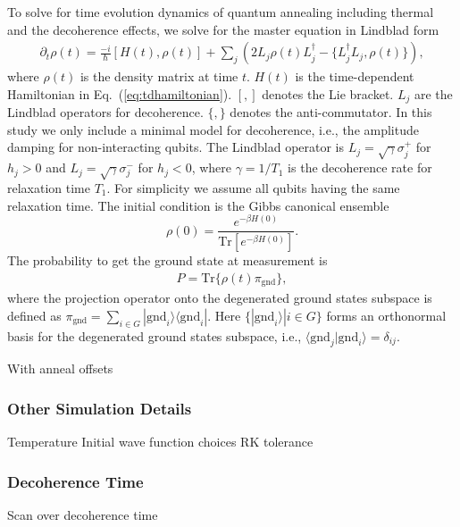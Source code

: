 \documentclass[prd,twocolumn,tightenlines,preprintnumbers,showpacs,superscriptaddress,notitlepage,nofootinbib,eqsecnum,floatfix,longbibliography]{revtex4}
\begin{document}
{\color{blue}


To solve for time evolution dynamics of quantum annealing including thermal and the decoherence effects, we solve for the master equation in Lindblad form
\begin{align}
\partial_t \rho (t) =  \frac{-i}{\hbar} [H(t) , \rho(t)] + \sum_j (2L_j \rho(t) L_j^\dagger - \{ L^\dagger_j L_j, \rho(t) \}) ,
\end{align}
where $\rho (t)$ is the density matrix at time $t$. $H(t)$ is the time-dependent Hamiltonian in Eq.~(\ref{eq:tdhamiltonian}). $[,]$ denotes the Lie bracket. $L_j$ are the Lindblad operators for decoherence. $\{, \}$ denotes the anti-commutator. In this study we only include a minimal model for decoherence, i.e., the amplitude damping for non-interacting qubits. The Lindblad operator is $L_j=\sqrt{\gamma} \sigma^{+}_j$ for $h_j>0$ and $L_j=\sqrt{\gamma} \sigma^{-}_j$ for $h_j<0$, where $\gamma = 1/T_1$ is the decoherence rate for relaxation time $T_1$. For simplicity we assume all qubits having the same relaxation time. The initial condition is the Gibbs canonical ensemble
\begin{equation}
\rho (0) =  \frac{e^{-\beta H(0)}}{\mbox{Tr}[e^{-\beta H(0)}]} .
\end{equation}
The probability to get the ground state at measurement is
\begin{align}
P =  \mbox{Tr} \{  \rho (t) \pi_{\mbox{gnd}} \}  ,
\end{align}
where the projection operator onto the degenerated ground states subspace is defined as $\pi_{\mbox{gnd}}=\sum_{i\in G} |\mbox{gnd}_i\rangle \langle \mbox{gnd}_i| $. Here $\{ | \mbox{gnd}_i \rangle | i \in G \}$ forms an orthonormal basis for the degenerated ground states subspace, i.e., $\langle \mbox{gnd}_j | \mbox{gnd}_i \rangle = \delta_{ij}$.





}

With anneal offsets

\subsubsection{Other Simulation Details}
Temperature
Initial wave function choices
RK tolerance

\subsubsection{Decoherence Time}
Scan over decoherence time
\end{document}
